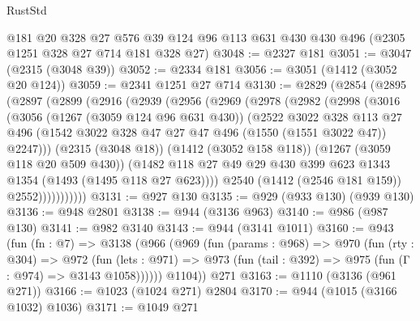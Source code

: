 \begin{lexlean}{RustStd}
\begin{coremodule}
{\begin{coremodule}
{{{{{{{{{{    @181
    @20
    @328
    @27
    @576
    @39
    @124
    @96
    @113
    @631
    @430
    @430
    @496
    (@2305 @1251 @328 @27 @714 @181 @328 @27)
@3048 := @2327 @181
@3051 := @3047 (@2315 (@3048 @39))
@3052 := @2334 @181
@3056 := @3051 (@1412 (@3052 @20 @124))
@3059 := @2341 @1251 @27 @714
@3130 := @2829
    (@2854
      (@2895
        (@2897
          (@2899
            (@2916
              (@2939
                (@2956
                  (@2969
                    (@2978
                      (@2982
                        (@2998
                          (@3016
                            (@3056
                              (@1267 (@3059 @124 @96 @631 @430))
                              (@2522
                                @3022
                                @328
                                @113
                                @27
                                @496
                                (@1542
                                  @3022
                                  @328
                                  @47
                                  @27
                                  @47
                                  @496
                                  (@1550 (@1551 @3022 @47))
                                  @2247)))
                            (@2315 (@3048 @18))
                            (@1412 (@3052 @158 @118))
                            (@1267 (@3059 @118 @20 @509 @430))
                            (@1482
                              @118
                              @27
                              @49
                              @29
                              @430
                              @399
                              @623
                              @1343
                              @1354
                              (@1493 (@1495 @118 @27 @623))))
                          @2540
                          (@1412 (@2546 @181 @159))
                          @2552)))))))))))
@3131 := @927 @130
@3135 := @929 (@933 @130) (@939 @130)
@3136 := @948 @2801
@3138 := @944 (@3136 @963)
@3140 := @986 (@987 @130)
@3141 := @982 @3140
@3143 := @944 (@3141 @1011)
@3160 := @943
    (fun (fn : @7) =>
    @3138
      (@966
        (@969
          (fun (params : @968) =>
          @970
            (fun (rty : @304) =>
            @972
              (fun (lets : @971) =>
              @973 (fun (tail : @392) => @975 (fun (Γ : @974) => @3143 @1058))))))
        @1104))
    @271
@3163 := @1110 (@3136 (@961 @271))
@3166 := @1023 (@1024 @271) @2804
@3170 := @944 (@1015 (@3166 @1032) @1036)
@3171 := @1049 @271
}}}}}}}}}}
\end{coremodule}}
\end{coremodule}
\end{lexlean}
